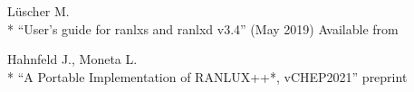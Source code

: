 \documentclass[letterpaper,12pt]{article}
\begin{document}
\begin{thebibliography}{99}
\begin{samepage}
  L\"uscher M.\\*
  ``User's guide for ranlxs and ranlxd v3.4'' (May 2019)
  Available from 
\end{samepage}



  Hahnfeld J., Moneta L.\\*
  ``A Portable Implementation of RANLUX++*, vCHEP2021''
  preprint 


\end{thebibliography}




\appendix
\renewcommand{\thesection}{Appendix \Alph{section}}
\pagebreak
\end{document}

